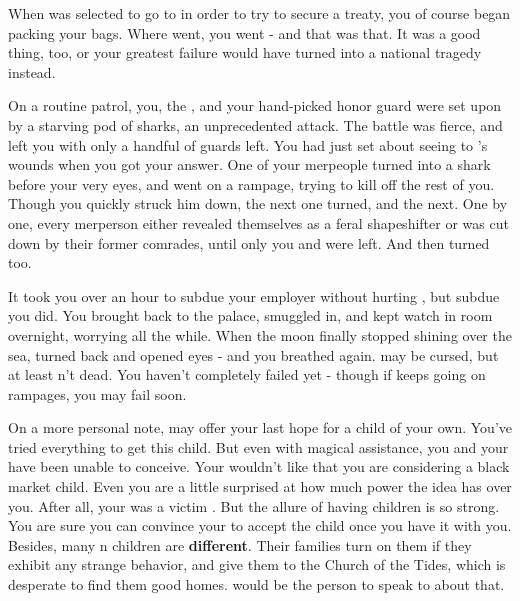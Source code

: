 \documentclass[char]{NeptuneBall}
\begin{document}
When \cPrince{} was selected to go to \pAtlantis{} in order to try to secure a treaty, you of course began packing your bags. Where \cPrince{\they} went, you went - and that was that. It was a good thing, too, or your greatest failure would have turned into a national tragedy instead.

On a routine patrol, you, the \cPrince{\prince}, and your hand-picked honor guard were set upon by a starving pod of sharks, an unprecedented attack. The battle was fierce, and left you with only a handful of guards left. You had just set about seeing to \cPrince{}'s wounds when you got your answer. One of your merpeople turned into a shark before your very eyes, and went on a rampage, trying to kill off the rest of you. Though you quickly struck him down, the next one turned, and the next. One by one, every merperson either revealed themselves as a feral shapeshifter or was cut down by their former comrades, until only you and \cPrince{} were left. And then \cPrince{\they} turned too.

It took you over an hour to subdue your employer without hurting \cPrince{\them}, but subdue \cPrince{\them} you did. You brought \cPrince{\them} back to the palace, smuggled \cPrince{\them} in, and kept watch in \cPrince{\their} room overnight, worrying all the while. When the moon finally stopped shining over the sea, \cPrince{\they} turned back and opened \cPrince{\their} eyes - and you breathed again. \cPrince{} may be cursed, but at least \cPrince{\they} \cPrince{\are}n't dead. You haven't completely failed yet - though if \cPrince{} keeps going on rampages, you may fail soon.

On a more personal note, \pAtlantis{} may offer your last hope for a child of your own.  You've tried everything to get this child. But even with magical assistance, you and your \cVHusband{\spouse} have been unable to conceive. Your \cVHusband{\spouse} wouldn't like that you are considering a black market child. Even you are a little surprised at how much power the idea has over you. After all, your \cSpy{\sibling} was a victim \cSpy{\themself}. But the allure of having children is so strong.  You are sure you can convince your \cVHusband{\spouse} to accept the child once you have it with you. Besides, many \pAtlantis{}n children are {\bf different}.  Their families turn on them if they exhibit any strange behavior, and give them to the Church of the Tides, which is desperate to find them good homes. \cPriest{} would be the person to speak to about that.
\end{document}
